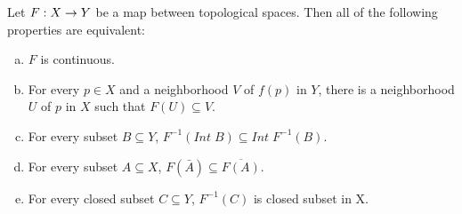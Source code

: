 \documentclass[11pt,a4paper]{article}
\begin{document}
\begin{prop}\label{prop:continuity_equivalence}
Let $F:X\rightarrow Y$ be a map between topological spaces. Then all of the following properties are equivalent:
\begin{enumerate}[(a)]
    \item $F$ is continuous.
    \item For every $p\in X$ and a neighborhood $V$ of $f(p)$ in $Y$, there is a neighborhood $U$ of $p$ in $X$ such that $F(U)\subseteq V$.
    \item For every subset $B\subseteq Y$, $F^{-1}(Int\;B)\subseteq Int\; F^{-1}(B)$.
    \item For every subset $A\subseteq X$, $F(\bar{A})\subseteq \overline{F(A)}$.
    \item For every closed subset $C\subseteq Y$, $F^{-1}(C)$ is closed subset in X.
\end{enumerate}
\end{prop}
\end{document}
